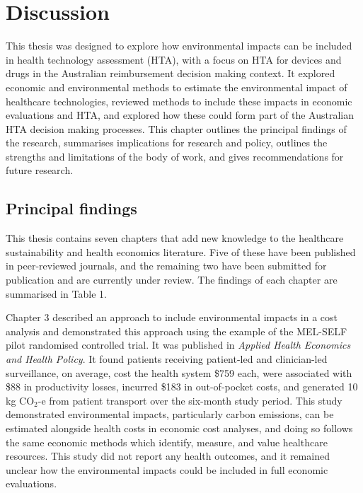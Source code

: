 \chapter{Discussion}
\label{ch-10}

\begin{refsection}

This thesis was designed to explore how environmental impacts can be included in health technology assessment (HTA), with a focus on HTA for devices and drugs in the Australian reimbursement decision making context. It explored economic and environmental methods to estimate the environmental impact of healthcare technologies, reviewed methods to include these impacts in economic evaluations and HTA, and explored how these could form part of the Australian HTA decision making processes. This chapter outlines the principal findings of the research, summarises implications for research and policy, outlines the strengths and limitations of the body of work, and gives recommendations for future research. 

\section{Principal findings}
This thesis contains seven chapters that add new knowledge to the healthcare sustainability and health economics literature. Five of these have been published in peer-reviewed journals, and the remaining two have been submitted for publication and are currently under review. The findings of each chapter are summarised in Table 1. 



Chapter 3 described an approach to include environmental impacts in a cost analysis and demonstrated this approach using the example of the MEL-SELF pilot randomised controlled trial. It was published in \textit{Applied Health Economics and Health Policy}. It found patients receiving patient-led and clinician-led surveillance, on average, cost the health system \$759 each, were associated with \$88 in productivity losses, incurred \$183 in out-of-pocket costs, and generated 10 kg CO$_{2}$-e from patient transport over the six-month study period. This study demonstrated environmental impacts, particularly carbon emissions, can be estimated alongside health costs in economic cost analyses, and doing so follows the same economic methods which identify, measure, and value healthcare resources. This study did not report any health outcomes, and it remained unclear how the environmental impacts could be included in full economic evaluations.


\end{refsection}
